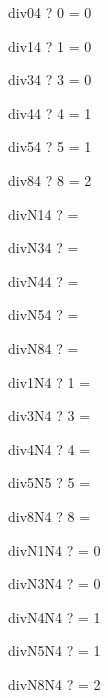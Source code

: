 \documentclass{article}
\begin{document}
\begin{theorem}{div04} \vdash?   0  = 0 \end{theorem}
\begin{theorem}{div14} \vdash?   1  = 0 \end{theorem}
\begin{theorem}{div34} \vdash?   3  = 0 \end{theorem}
\begin{theorem}{div44} \vdash?   4  = 1 \end{theorem}
\begin{theorem}{div54} \vdash?   5  = 1 \end{theorem}
\begin{theorem}{div84} \vdash?   8  = 2 \end{theorem}
\begin{theorem}{divN14} \vdash?     =  \end{theorem}
\begin{theorem}{divN34} \vdash?     =  \end{theorem}
\begin{theorem}{divN44} \vdash?     =  \end{theorem}
\begin{theorem}{divN54} \vdash?     =  \end{theorem}
\begin{theorem}{divN84} \vdash?     =  \end{theorem}
\begin{theorem}{div1N4} \vdash?   1 \div {} =  \end{theorem}
\begin{theorem}{div3N4} \vdash?   3 \div {} =  \end{theorem}
\begin{theorem}{div4N4} \vdash?   4 \div {} =  \end{theorem}
\begin{theorem}{div5N5} \vdash?   5 \div {} =  \end{theorem}
\begin{theorem}{div8N4} \vdash?   8 \div {} =  \end{theorem}
\begin{theorem}{divN1N4} \vdash?    \div {} = 0 \end{theorem}
\begin{theorem}{divN3N4} \vdash?    \div {} = 0 \end{theorem}
\begin{theorem}{divN4N4} \vdash?    \div {} = 1 \end{theorem}
\begin{theorem}{divN5N4} \vdash?    \div {} = 1 \end{theorem}
\begin{theorem}{divN8N4} \vdash?    \div {} = 2 \end{theorem}
\end{document}
